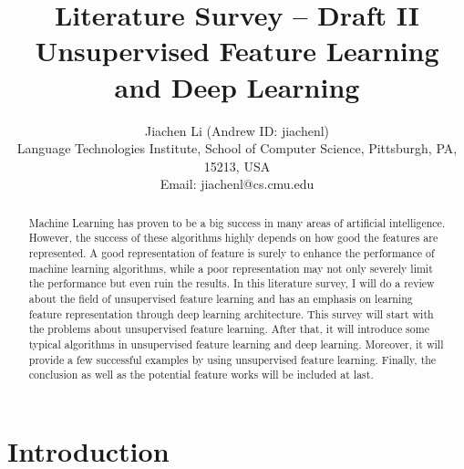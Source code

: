 \documentclass[conference]{IEEEtran}
\begin{document}
\title{Literature Survey -- Draft II \\ Unsupervised Feature Learning and Deep Learning}
\author{Jiachen Li (Andrew ID: jiachenl)\\%
Language Technologies Institute, School of Computer Science, Pittsburgh, PA, 15213, USA\\
Email: jiachenl@cs.cmu.edu
}





\maketitle %




\begin{abstract}
Machine Learning has proven to be a big success in many areas of artificial intelligence. However, the success of these algorithms highly depends on how good the features are represented. A good representation of feature is surely
to enhance the performance of machine learning algorithms, while a poor representation may not only severely limit the performance
but even ruin the results. In this literature survey, I will do a review about the field of unsupervised feature learning and has an emphasis on learning feature representation through deep learning architecture. This survey will start with the problems about unsupervised feature learning. After that, it will introduce some typical algorithms in unsupervised feature learning and deep learning. Moreover, it will provide a few successful examples by using unsupervised feature learning. Finally, the conclusion as well as the potential feature works will be included at last.

\end{abstract}

\section{Introduction}
\end{document}
